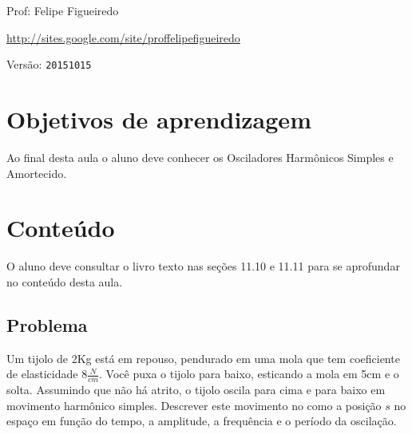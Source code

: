 \documentclass[a4paper]{article}
\begin{document}
\parbox[c]{.825\textwidth}{\raggedright%
{Prof: Felipe Figueiredo\par}
{\url{http://sites.google.com/site/proffelipefigueiredo}\par}
}

Versão: \verb|20151015|



\section{Objetivos de aprendizagem}

Ao final desta aula o aluno deve conhecer os Osciladores Harmônicos
Simples e Amortecido.



\section{Conteúdo}

O aluno deve consultar o livro texto nas seções 11.10 e 11.11 para se
aprofundar no conteúdo desta aula.

\subsection{Problema}

Um tijolo de 2Kg está em repouso, pendurado em uma mola que tem
coeficiente de elasticidade 8$\frac{N}{cm}$. Você puxa o tijolo para
baixo, esticando a mola em 5cm e o solta. Assumindo que não há atrito,
o tijolo oscila para cima e para baixo em movimento harmônico
simples. Descrever este movimento no como a posição $s$ no espaço em
função do tempo, a amplitude, a frequência e o período da oscilação.
\end{document}
